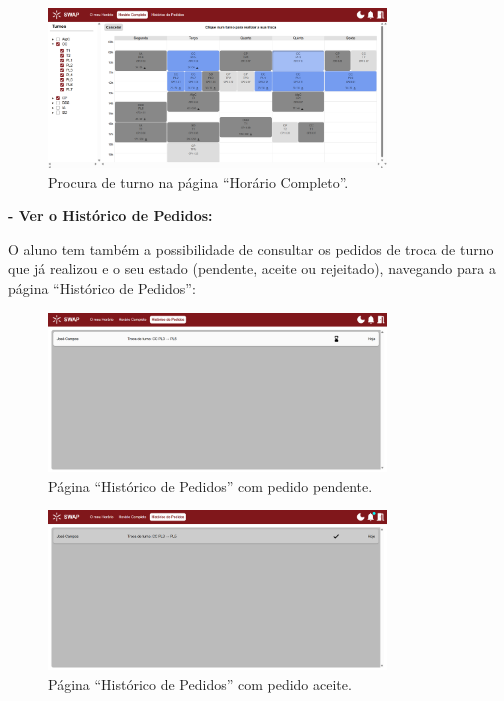 \documentclass[12pt, a4paper]{article}
\begin{document}
\begin{figure}[H]
    \centering
    \includegraphics[width=0.8\textwidth]{res/manual/procura_troca_horario_completo.png}
    \caption{Procura de turno na página ``Horário Completo''.}
    \label{procura_troca_horario_completo}
\end{figure}

\textbf{- Ver o Histórico de Pedidos:}

O aluno tem também a possibilidade de consultar os pedidos de troca de turno que já realizou e o seu
estado (pendente, aceite ou rejeitado), navegando para a página ``Histórico de Pedidos'':

\begin{figure}[H]
    \centering
    \includegraphics[width=0.8\textwidth]{res/manual/historico_pedidos.png}
    \caption{Página ``Histórico de Pedidos'' com pedido pendente.}
    \label{historico_pedidos}
\end{figure}

\begin{figure}[H]
    \centering
    \includegraphics[width=0.8\textwidth]{res/manual/historico_pedidos_resolvido.png}
    \caption{Página ``Histórico de Pedidos'' com pedido aceite.}
    \label{historico_pedidos_resolvido}
\end{figure}
\end{document}
